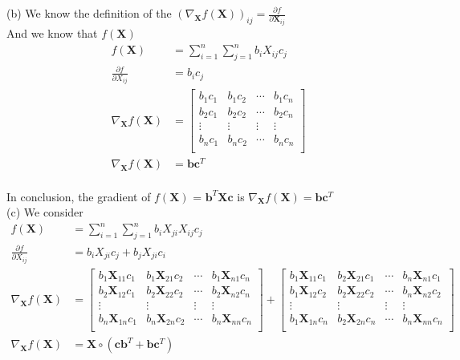 \documentclass[a4paper,12pt]{article}
\begin{document}
(b) 
We know the definition of the \((\nabla_{\bm{X}} f(\bm{X}))_{ij} = \frac{\partial f}{\partial \bm{X}_{ij}} \) \\
And we know that \(f(\bm{X})\)
\begin{align*}
    f(\bm{X}) &= \sum_{i=1}^{n}\sum_{j=1}^{n} b_iX_{ij}c_j \\
    \frac{\partial f}{\partial X_{ij}} &= b_ic_j \\ 
    \nabla_{\bm{X}} f(\bm{X}) &= \begin{bmatrix}
        b_1c_1 & b_1c_2 & \cdots & b_1c_n \\
        b_2c_1 & b_2c_2 & \cdots & b_2c_n \\
        \vdots &\vdots & \vdots &\vdots \\
        b_nc_1 & b_nc_2 & \cdots & b_nc_n \\
    \end{bmatrix} \\
    \nabla_{\bm{X}} f(\bm{X}) &= \bm{b}\bm{c}^T
\end{align*} \\
In conclusion, the gradient of \(f(\bm{X})\) = \(\bm{b}^T\bm{X}\bm{c}\) is \(\nabla_{\bm{X}} f(\bm{X}) = \bm{b}\bm{c}^T\) \\

(c) We consider\\
\begin{align*}
    f(\bm{X}) &= \sum_{i=1}^{n}\sum_{j=1}^{n} b_iX_{ji}X_{ij}c_j \\
    \frac{\partial f}{\partial X_{ij}} &= b_iX_{ji}c_j + b_jX_{ji}c_i \\ 
    \nabla_{\bm{X}} f(\bm{X}) &= \begin{bmatrix}
        b_1\bm{X}_{11}c_1 & b_1\bm{X}_{21}c_2 & \cdots & b_1\bm{X}_{n1}c_n \\
        b_2\bm{X}_{12}c_1 & b_2\bm{X}_{22}c_2 & \cdots & b_2\bm{X}_{n2}c_n \\
        \vdots &\vdots & \vdots &\vdots \\
        b_n\bm{X}_{1n}c_1 & b_n\bm{X}_{2n}c_2 & \cdots & b_n\bm{X}_{nn}c_n \\
    \end{bmatrix}  + 
    \begin{bmatrix}
        b_1\bm{X}_{11}c_1 & b_2\bm{X}_{21}c_1 & \cdots & b_n\bm{X}_{n1}c_1 \\
        b_1\bm{X}_{12}c_2 & b_2\bm{X}_{22}c_2 & \cdots & b_n\bm{X}_{n2}c_2 \\
        \vdots &\vdots & \vdots &\vdots \\
        b_1\bm{X}_{1n}c_n & b_2\bm{X}_{2n}c_n & \cdots & b_n\bm{X}_{nn}c_n \\
    \end{bmatrix}   \\
    \nabla_{\bm{X}} f(\bm{X}) &= \bm{X}\circ (\bm{c}\bm{b}^T + \bm{b}\bm{c}^T)
\end{align*}
\end{document}
